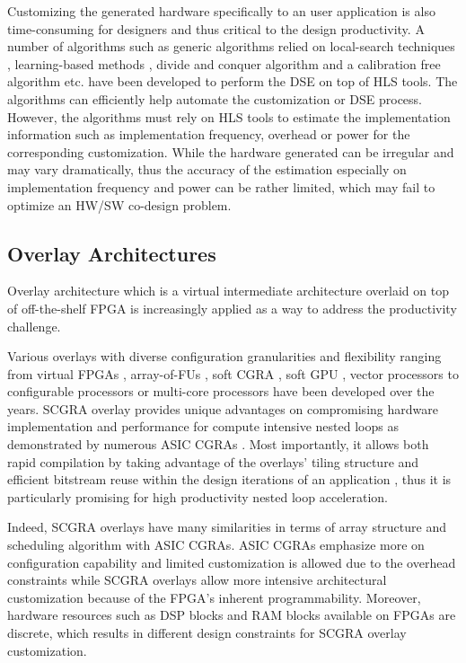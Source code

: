 Customizing the generated hardware specifically to an user 
application is also time-consuming for designers and thus critical to the design 
productivity. A number of algorithms such as generic algorithms 
relied on local-search techniques \cite{schafer2009adaptive,sengupta1997genetic}, 
learning-based methods \cite{onlinecustomization,carrion2012machine}, 
divide and conquer algorithm \cite{DCcustomization} 
and a calibration free algorithm \cite{RCcustomization} etc. have been developed 
to perform the DSE on top of HLS tools. The algorithms can efficiently help automate the 
customization or DSE process. However, the algorithms must rely on HLS tools 
to estimate the implementation information such as implementation frequency, 
overhead or power for the corresponding customization. While the hardware generated 
can be irregular and may vary dramatically, thus the accuracy of the estimation 
especially on implementation frequency and power can be rather limited, which may
fail to optimize an HW/SW co-design problem.  

\subsection{Overlay Architectures}
Overlay architecture which is a virtual intermediate architecture overlaid on 
top of off-the-shelf FPGA is increasingly applied as a way to address the 
productivity challenge. 

Various overlays with diverse configuration granularities and flexibility 
ranging from virtual FPGAs \cite{Grant2011Malibu,ZUMA2012}, 
array-of-FUs \cite{mesh-FUs,ferreira2011fpga}, soft 
CGRA \cite{kissler2006dynamically,scgra}, soft GPU \cite{Guppy2012GPU-Like}, 
vector processors\cite{Yiannacouras2009FPS,MXP2013} to 
configurable processors or multi-core processors 
\cite{unnikrishnan2009application,MARC2010,Yiannacouras2007Exploration,Capalija2009coarse-grain,OCTAVO2012,iDEA2012} 
have been developed over the years. SCGRA overlay provides unique 
advantages on compromising hardware implementation 
and performance for compute intensive nested loops as demonstrated 
by numerous ASIC CGRAs \cite{tessier2001reconfigurable,compton2002reconfigurable}.
Most importantly, it allows both rapid compilation by taking advantage of 
the overlays' tiling structure \cite{ROB2014} and efficient bitstream 
reuse within the design iterations of an application \cite{scgra}, 
thus it is particularly promising for high productivity nested loop acceleration.

Indeed, SCGRA overlays have many similarities in terms of array structure 
and scheduling algorithm with ASIC CGRAs. ASIC CGRAs emphasize 
more on configuration capability and limited customization is allowed due 
to the overhead constraints \cite{zhou2014application,miniskar2014retargetable} 
while SCGRA overlays allow more intensive architectural customization 
because of the FPGA's inherent programmability. Moreover, hardware resources such as 
DSP blocks and RAM blocks available on FPGAs are discrete, which results in different 
design constraints for SCGRA overlay customization. 

